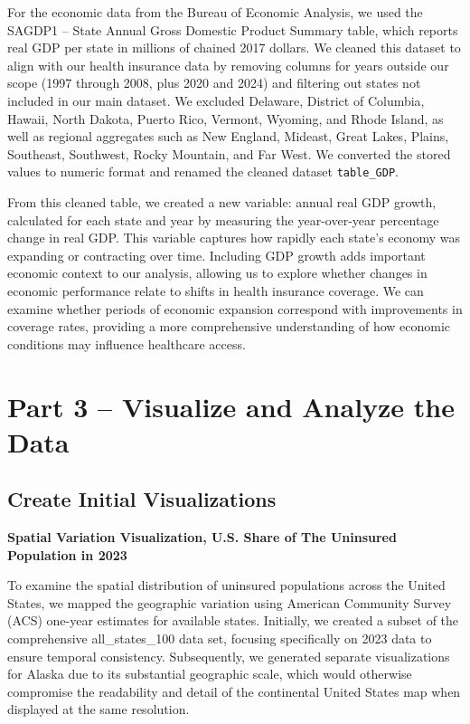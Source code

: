 \documentclass[
]{article}
\begin{document}
For the economic data from the Bureau of Economic Analysis, we used the
SAGDP1 -- State Annual Gross Domestic Product Summary table, which
reports real GDP per state in millions of chained 2017 dollars. We
cleaned this dataset to align with our health insurance data by removing
columns for years outside our scope (1997 through 2008, plus 2020 and
2024) and filtering out states not included in our main dataset. We
excluded Delaware, District of Columbia, Hawaii, North Dakota, Puerto
Rico, Vermont, Wyoming, and Rhode Island, as well as regional aggregates
such as New England, Mideast, Great Lakes, Plains, Southeast, Southwest,
Rocky Mountain, and Far West. We converted the stored values to numeric
format and renamed the cleaned dataset \texttt{table\_GDP}.

From this cleaned table, we created a new variable: annual real GDP
growth, calculated for each state and year by measuring the
year-over-year percentage change in real GDP. This variable captures how
rapidly each state's economy was expanding or contracting over time.
Including GDP growth adds important economic context to our analysis,
allowing us to explore whether changes in economic performance relate to
shifts in health insurance coverage. We can examine whether periods of
economic expansion correspond with improvements in coverage rates,
providing a more comprehensive understanding of how economic conditions
may influence healthcare access.

\section{Part 3 -- Visualize and Analyze the
Data}\label{part-3-visualize-and-analyze-the-data}

\subsection{Create Initial
Visualizations}\label{create-initial-visualizations}

\textbf{Spatial Variation Visualization, U.S. Share of The Uninsured
Population in 2023}

To examine the spatial distribution of uninsured populations across the
United States, we mapped the geographic variation using American
Community Survey (ACS) one-year estimates for available states.
Initially, we created a subset of the comprehensive all\_states\_100
data set, focusing specifically on 2023 data to ensure temporal
consistency. Subsequently, we generated separate visualizations for
Alaska due to its substantial geographic scale, which would otherwise
compromise the readability and detail of the continental United States
map when displayed at the same resolution.
\end{document}

